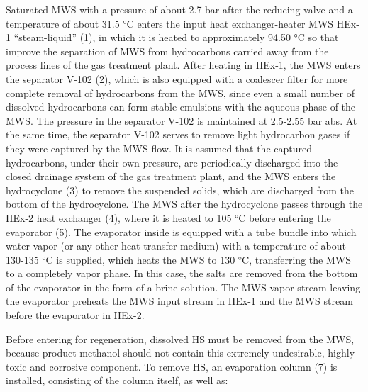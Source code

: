 


\begin{multicols}{2}
Saturated MWS with a pressure of about 2.7 bar after the reducing valve
and a temperature of about 31.5 °C enters the input heat
exchanger-heater MWS HEx-1 ``steam-liquid'' (1), in which it is heated
to approximately 94.50 °C so that improve the separation of MWS from
hydrocarbons carried away from the process lines of the gas treatment
plant. After heating in HEx-1, the MWS enters the separator V-102 (2),
which is also equipped with a coalescer filter for more complete removal
of hydrocarbons from the MWS, since even a small number of dissolved
hydrocarbons can form stable emulsions with the aqueous phase of the
MWS. The pressure in the separator V-102 is maintained at 2.5-2.55 bar
abs. At the same time, the separator V-102 serves to remove light
hydrocarbon gases if they were captured by the MWS flow. It is assumed
that the captured hydrocarbons, under their own pressure, are
periodically discharged into the closed drainage system of the gas
treatment plant, and the MWS enters the hydrocyclone (3) to remove the
suspended solids, which are discharged from the bottom of the
hydrocyclone. The MWS after the hydrocyclone passes through the HEx-2
heat exchanger (4), where it is heated to 105 °C before entering the
evaporator (5). The evaporator inside is equipped with a tube bundle
into which water vapor (or any other heat-transfer medium) with a
temperature of about 130-135 °C is supplied, which heats the MWS to 130
°C, transferring the MWS to a completely vapor phase. In this case, the
salts are removed from the bottom of the evaporator in the form of a
brine solution. The MWS vapor stream leaving the evaporator preheats the
MWS input stream in HEx-1 and the MWS stream before the evaporator in
HEx-2.

Before entering for regeneration, dissolved HS must be
removed from the MWS, because product methanol should not contain this
extremely undesirable, highly toxic and corrosive component. To remove
HS, an evaporation column (7) is installed, consisting
of the column itself, as well as:


\end{multicols}

